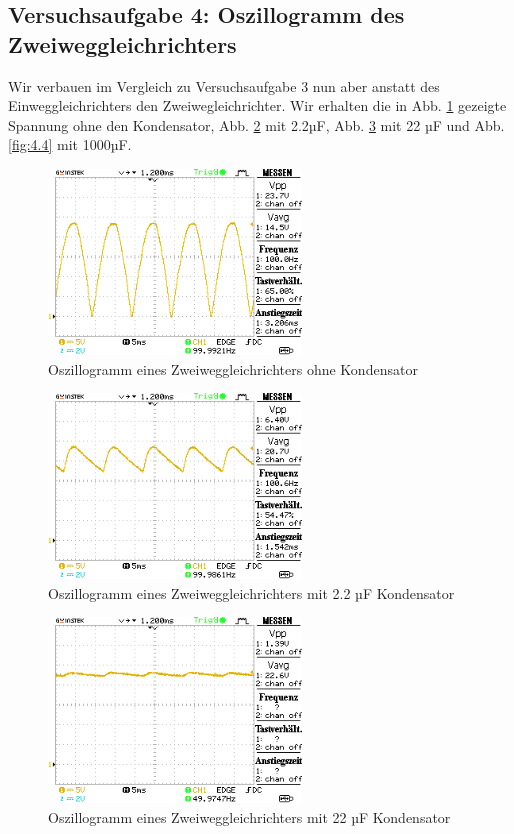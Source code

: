 \documentclass[a4paper,10pt]{article}
\numberwithin{equation}{section}
\begin{document}
\subsection{Versuchsaufgabe 4: Oszillogramm des Zweiweggleichrichters}
Wir verbauen im Vergleich zu Versuchsaufgabe 3 nun aber anstatt des Einweggleichrichters den Zweiwegleichrichter. Wir erhalten die in Abb. \ref{fig:4.1} gezeigte Spannung ohne den Kondensator, Abb. \ref{fig:4.2} mit 2.2µF, Abb. \ref{fig:4.3} mit 22 µF und Abb. \ref{fig:4.4} mit 1000µF.
\begin{figure}[h]
	\centering
	\includegraphics[width=0.6\textwidth]{data/a4_a.BMP.png}
	\caption{Oszillogramm eines Zweiweggleichrichters ohne Kondensator}
	\label{fig:4.1}
\end{figure}
\begin{figure}[h]
	\centering
	\includegraphics[width=0.6\textwidth]{data/a4_b.BMP.png}
	\caption{Oszillogramm eines Zweiweggleichrichters mit 2.2 µF Kondensator}
	\label{fig:4.2}
\end{figure}
\begin{figure}[h]
	\centering
	\includegraphics[width=0.6\textwidth]{data/a4_c.BMP.png}
	\caption{Oszillogramm eines Zweiweggleichrichters mit 22 µF Kondensator}
	\label{fig:4.3}
\end{figure}
\end{document}
